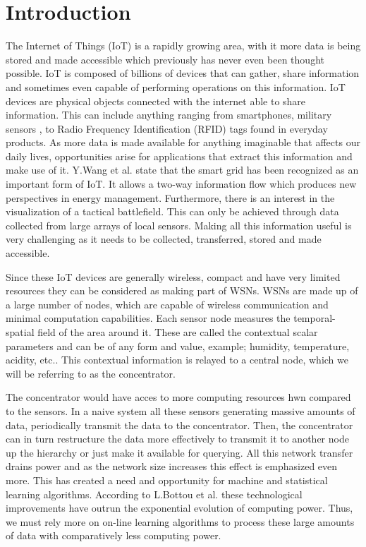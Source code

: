 \documentclass{mproj}
\begin{document}
\chapter{Introduction}\label{intro}
The Internet of Things (IoT) is a rapidly growing area, with it more data is being stored and made accessible which previously has never even been thought possible. IoT is composed of billions of devices that can gather, share information and sometimes even capable of performing operations on this information. IoT devices are physical objects connected with the internet able to share information. This can include anything ranging from smartphones, military sensors \cite{surveyMilitary}, to Radio Frequency Identification (RFID) tags found in everyday products. As more data is made available for anything imaginable that affects our daily lives, opportunities arise for applications that extract this information and make use of it. Y.Wang et al. \cite{distributedEnergyDistribution} state that the smart grid has been recognized as an important form of IoT. It allows a two-way information flow which produces new perspectives in energy management. Furthermore, there is an interest in the visualization of a tactical battlefield. This can only be achieved through data collected from large arrays of local sensors. \cite{SmartSensorWeb} Making all this information useful is very challenging as it needs to be collected, transferred, stored and made accessible. \cite{intelligentContextualInformation}

Since these IoT devices are generally wireless, compact and have very limited resources they can be considered as making part of WSNs. WSNs are made up of a large number of nodes, which are capable of wireless communication and minimal computation capabilities. \cite{adaptiveDataForwarding} Each sensor node measures the temporal-spatial field of the area around it. These are called the contextual scalar parameters and can be of any form and value, example; humidity, temperature, acidity, etc.. This contextual information is relayed to a central node, which we will be referring to as the concentrator. \cite{adaptiveDataForwarding}

The concentrator would have acces to more computing resources hwn compared to the sensors. In a naive system all these sensors generating massive amounts of data, periodically transmit the data to the concentrator. Then, the concentrator can in turn restructure the data more effectively to transmit it to another node up the hierarchy or just make it available for querying. All this network transfer drains power and as the network size increases this effect is emphasized even more. This has created a need and opportunity for machine and statistical learning algorithms. \cite{LargeScaleOnlineLearning} According to L.Bottou et al. \cite{LargeScaleOnlineLearning} these technological improvements have outrun the exponential evolution of computing power. Thus, we must rely more on on-line learning algorithms to process these large amounts of data with comparatively less computing power.
\end{document}
